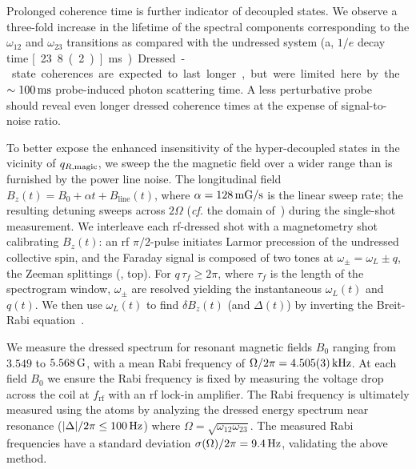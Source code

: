 \documentclass[aps,prl,reprint,superscriptaddress,floatfix]{revtex4-1}
\begin{document}
Prolonged coherence time is further indicator of decoupled states.
We observe a three-fold increase in the lifetime of the spectral components corresponding to the $\omega_{12}$ and $\omega_{23}$ transitions as compared with the undressed system (a, $1/e$ decay time \unit[23.8(2)]{ms}).
Dressed-state coherences are expected to last longer, but were limited here by the $\sim\unit[100]{ms}$ probe-induced photon scattering time.
A less perturbative probe~\cite{jasperse_magic-wavelength_2017} should reveal even longer dressed coherence times at the expense of signal-to-noise ratio. 

To better expose the enhanced insensitivity of the hyper-decoupled states in the vicinity of $q_{R,\text{magic}}$, we sweep the the magnetic field over a wider range than is furnished by the power line noise.
The longitudinal field $B_z(t) = B_0 + \alpha t + B_{\text{line}}(t)$, where $\alpha = \unit[128]{mG/s}$ is the linear sweep rate; the resulting detuning sweeps across $2\Omega$ (\textit{cf.} the domain of~) during the single-shot measurement.
We interleave each rf-dressed shot with a magnetometry shot calibrating $B_z(t)$: an rf $\pi/2$-pulse initiates Larmor precession of the undressed collective spin, and the Faraday signal is composed of two tones at $\omega_\pm = \omega_L \pm q$, the Zeeman splittings (, top).
For $q \, \tau_f \geq 2\pi$, where $\tau_f$ is the length of the spectrogram window, $\omega_\pm$ are resolved yielding the instantaneous $\omega_L(t)$ and $q(t)$.
We then use $\omega_L(t)$ to find $\delta B_z(t)$ (and $\Delta(t)$) by inverting the Breit-Rabi equation~\cite{ramsey_molecular_1956,Note3}.

We measure the dressed spectrum for resonant magnetic fields $B_0$ ranging from $3.549$ to $\unit[5.568]{G}$, with a mean Rabi frequency of $\Omega/2\pi = \unit[4.505(3)]{kHz}$.
At each field $B_0$ we ensure the Rabi frequency is fixed by measuring the voltage drop across the coil at $f_{\text{rf}}$ with an rf lock-in amplifier.
The Rabi frequency is ultimately measured using the atoms by analyzing the dressed energy spectrum near resonance ($\abs{\Delta}/2\pi \leq \unit[100]{Hz}$) where $\Omega = \sqrt{\omega_{12} \omega_{23}}$.
The measured Rabi frequencies have a standard deviation $\sigma(\Omega)/2\pi = \unit[9.4]{Hz}$, validating the above method.
\end{document}
